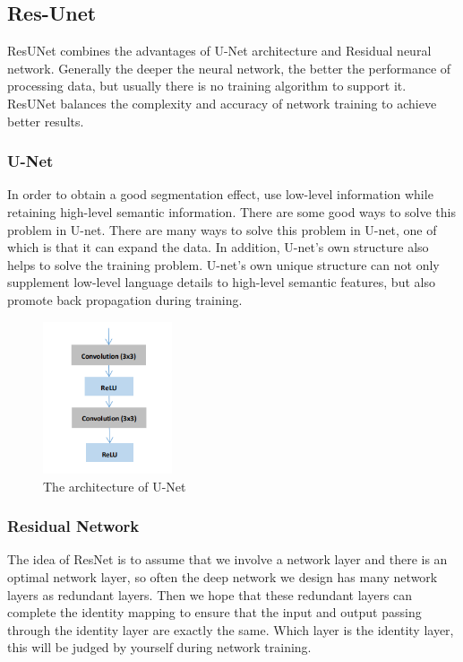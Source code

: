 \documentclass{article}
\begin{document}
\subsection{Res-Unet}
ResUNet combines the advantages of U-Net architecture and Residual neural network.
Generally the deeper the neural network, the better the performance of processing data, but usually there is no training algorithm to support it.
ResUNet balances the complexity and accuracy of network training to achieve better results.\cite{zhang2019zebrafish}
\subsubsection{U-Net}
In order to obtain a good segmentation effect, use low-level information while retaining high-level semantic information.
There are some good ways to solve this problem in U-net.
There are many ways to solve this problem in U-net, one of which is that it can expand the data.
In addition, U-net's own structure also helps to solve the training problem. U-net's own unique structure can not only supplement low-level language details to high-level semantic features, but also promote back propagation during training.\cite{zhang2018road}

\begin{figure}[H]
    \centering
    \includegraphics[width = 1.5in]{architecture of U-Net}
    \caption{The architecture of U-Net}
    \label{The architecture of U-Net}
\end{figure}
\subsubsection{Residual Network}
The idea of ResNet is to assume that we involve a network layer and there is an optimal network layer, so often the deep network we design has many network layers as redundant layers.
Then we hope that these redundant layers can complete the identity mapping to ensure that the input and output passing through the identity layer are exactly the same.
Which layer is the identity layer, this will be judged by yourself during network training.
\end{document}
